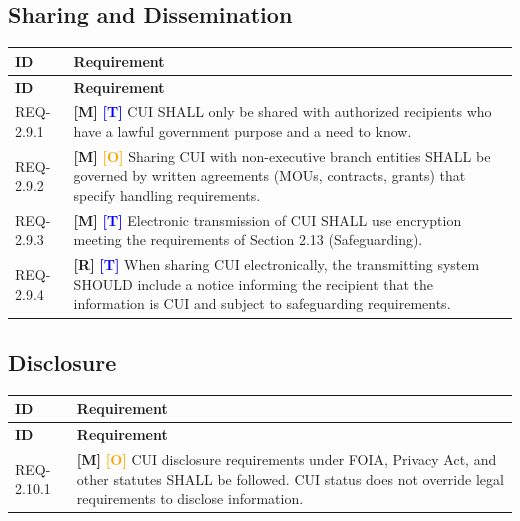 \documentclass[11pt,letterpaper]{article}
\begin{document}
\subsection{Sharing and Dissemination}

\begin{longtable}{@{}p{1.4cm}p{11.6cm}@{}}
\toprule
\textbf{ID} & \textbf{Requirement} \\
\midrule
\endfirsthead
\toprule
\textbf{ID} & \textbf{Requirement} \\
\midrule
\endhead

REQ-2.9.1 & \textcolor{mandatory}{\textbf{[M]}} \textcolor{blue}{\textbf{[T]}} CUI SHALL only be shared with authorized recipients who have a lawful government purpose and a need to know. \\[6pt]

REQ-2.9.2 & \textcolor{mandatory}{\textbf{[M]}} \textcolor{orange}{\textbf{[O]}} Sharing CUI with non-executive branch entities SHALL be governed by written agreements (MOUs, contracts, grants) that specify handling requirements. \\[6pt]

REQ-2.9.3 & \textcolor{mandatory}{\textbf{[M]}} \textcolor{blue}{\textbf{[T]}} Electronic transmission of CUI SHALL use encryption meeting the requirements of Section 2.13 (Safeguarding). \\[6pt]

REQ-2.9.4 & \textcolor{recommended}{\textbf{[R]}} \textcolor{blue}{\textbf{[T]}} When sharing CUI electronically, the transmitting system SHOULD include a notice informing the recipient that the information is CUI and subject to safeguarding requirements. \\[6pt]

\bottomrule
\end{longtable}

\subsection{Disclosure}

\begin{longtable}{@{}p{1.4cm}p{11.6cm}@{}}
\toprule
\textbf{ID} & \textbf{Requirement} \\
\midrule
\endfirsthead
\toprule
\textbf{ID} & \textbf{Requirement} \\
\midrule
\endhead

REQ-2.10.1 & \textcolor{mandatory}{\textbf{[M]}} \textcolor{orange}{\textbf{[O]}} CUI disclosure requirements under FOIA, Privacy Act, and other statutes SHALL be followed. CUI status does not override legal requirements to disclose information. \\[6pt]

\bottomrule
\end{longtable}
\end{document}
